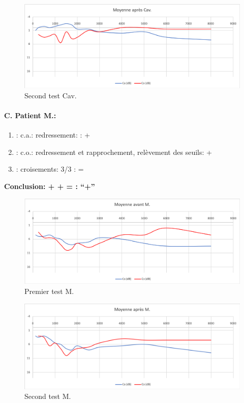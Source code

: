                \begin{figure}
\centering
\includegraphics[width=0.7\linewidth]{images/graphiques/cav_post.png}
\caption[Moyenne OG+OD]{Second test Cav.}
       
                \end{figure}



                
               \paragraph{ C. Patient M.:}


	\begin{enumerate}
 		
 		\item : c.a.: redressement: : +   %
                
 		\item : c.o.: redressement et rapprochement,
                  relèvement des seuils:  +     %
 		\item : croisements: 3/3 :  =
                  
                \end{enumerate}

                \textbf{  Conclusion:  +  +  =     : ``+''}

                \begin{figure}
\centering
\includegraphics[width=0.7\linewidth]{images/graphiques/m_pre.png}
\caption[Moyenne OG+OD]{Premier test M.}
       
\end{figure}


                        \begin{figure}
\centering
\includegraphics[width=0.7\linewidth]{images/graphiques/m_post.png}
\caption[Moyenne OG+OD]{Second test M.}
       
\end{figure}


